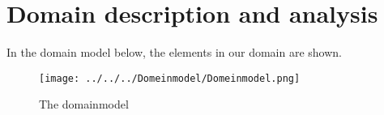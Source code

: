 \section{Domain description and analysis}
In the domain model below, the elements in our domain are shown.
\begin{figure}[H]
	\centering
	\texttt{[image: ../../../Domeinmodel/Domeinmodel.png]}
	\caption{The domainmodel}
	\label{cd:domeinmodel}
\end{figure}

